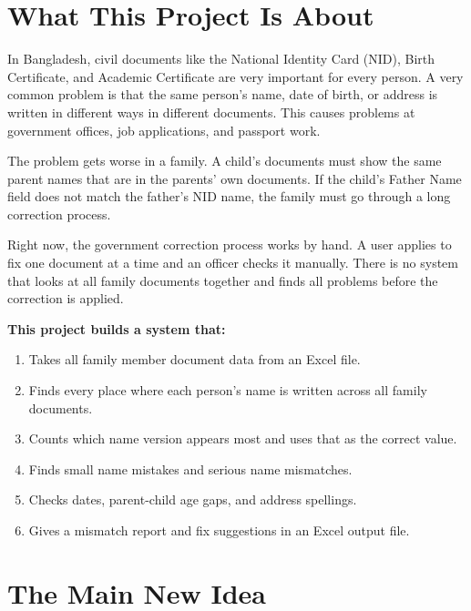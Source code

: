 \documentclass[12pt, a4paper]{article}
\begin{document}
\clearpage
{}

\section{What This Project Is About}

In Bangladesh, civil documents like the National Identity Card (NID),
Birth Certificate, and Academic Certificate are very important for every
person. A very common problem is that the same person's name, date of
birth, or address is written in different ways in different documents.
This causes problems at government offices, job applications, and passport work.

The problem gets worse in a family. A child's documents must show the same
parent names that are in the parents' own documents. If the child's Father
Name field does not match the father's NID name, the family must go through
a long correction process.

Right now, the government correction process works by hand. A user applies
to fix one document at a time and an officer checks it manually. There is no
system that looks at all family documents together and finds all problems
before the correction is applied.

\vspace{0.4cm}
\textbf{This project builds a system that:}

\begin{enumerate}
    \item Takes all family member document data from an Excel file.
    \item Finds every place where each person's name is written across all
          family documents.
    \item Counts which name version appears most and uses that as the correct value.
    \item Finds small name mistakes and serious name mismatches.
    \item Checks dates, parent-child age gaps, and address spellings.
    \item Gives a mismatch report and fix suggestions in an Excel output file.
\end{enumerate}

\section{The Main New Idea}
\end{document}
